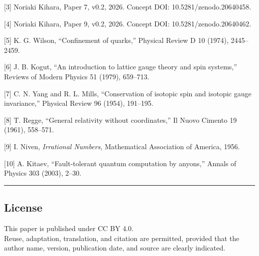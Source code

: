 \documentclass[
]{ltjsarticle}
\begin{document}
{[}3{]} Noriaki Kihara, Paper 7, v0.2, 2026. Concept DOI:
10.5281/zenodo.20640458.

{[}4{]} Noriaki Kihara, Paper 9, v0.2, 2026. Concept DOI:
10.5281/zenodo.20640462.

{[}5{]} K. G. Wilson, ``Confinement of quarks,'' Physical Review D 10
(1974), 2445--2459.

{[}6{]} J. B. Kogut, ``An introduction to lattice gauge theory and spin
systems,'' Reviews of Modern Physics 51 (1979), 659--713.

{[}7{]} C. N. Yang and R. L. Mills, ``Conservation of isotopic spin and
isotopic gauge invariance,'' Physical Review 96 (1954), 191--195.

{[}8{]} T. Regge, ``General relativity without coordinates,'' Il Nuovo
Cimento 19 (1961), 558--571.

{[}9{]} I. Niven, \emph{Irrational Numbers}, Mathematical Association of
America, 1956.

{[}10{]} A. Kitaev, ``Fault-tolerant quantum computation by anyons,''
Annals of Physics 303 (2003), 2--30.

\begin{center}\rule{0.5\linewidth}{0.5pt}\end{center}

\subsection{License}\label{license}

This paper is published under CC BY 4.0.\\
Reuse, adaptation, translation, and citation are permitted, provided
that the author name, version, publication date, and source are clearly
indicated.
\end{document}
